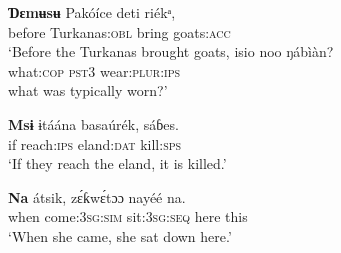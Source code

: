 \ea\label{ex:morph:14}
  \ea
  \gll \textbf{Ɗ{ɛmʉsʉ}}   Pakóíce     deti   riékᵃ, \\
before   Turkanas:\textsc{obl}   bring   goats:\textsc{acc}    \\ 
  \glt ‘Before the Turkanas brought goats,
  \medskip
  \ex
  \gll isio     noo   ŋábìàn? \\
  what:\textsc{cop}   \textsc{pst3}   wear:\textsc{plur:ips}    \\
  \glt  what was typically worn?’ 
  \z
\z




\ea\label{ex:morph:15}
\gll \textbf{M{\Í}sɨ}   ɨtáána   basaúrék{\ᵉ},   sáɓes. \\
if   reach:\textsc{ips}   eland:\textsc{dat}   kill:\textsc{sps}   \\
\glt ‘If they reach the eland, it is killed.’ 
\z




\ea\label{ex:morph:16}
\gll \textbf{Na}   átsik{\ᵉ},       z\'{ɛ}ƙw\'{ɛ}tɔɔ   nayéé   na. \\
 when   come:\textsc{3sg:sim}   sit:\textsc{3sg:seq}   here   this   \\
\glt ‘When she came, she sat down here.’ 
\z




